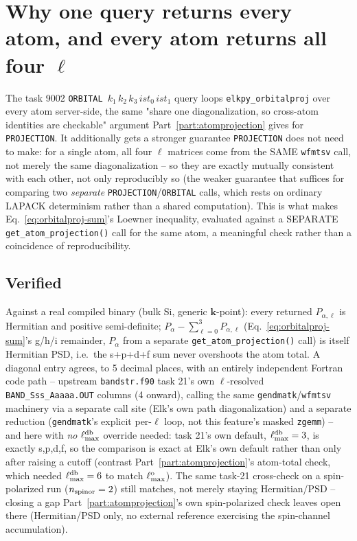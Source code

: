 \documentclass[11pt]{article}
\begin{document}
\section{Why one query returns every atom, and every atom returns all four $\ell$}
\label{sec:orbitalproj-verify}

The task 9002 \texttt{ORBITAL $k_1\,k_2\,k_3\,ist_0\,ist_1$} query loops
\texttt{elkpy\_orbitalproj} over every atom server-side, the same "share one
diagonalization, so cross-atom identities are checkable" argument
Part~\ref{part:atomprojection} gives for \texttt{PROJECTION}. It additionally gets a
stronger guarantee \texttt{PROJECTION} does not need to make: for a single atom, all four
$\ell$ matrices come from the SAME \texttt{wfmtsv} call, not merely the same
diagonalization -- so they are exactly mutually consistent with each other, not only
reproducibly so (the weaker guarantee that suffices for comparing two \emph{separate}
\texttt{PROJECTION}/\texttt{ORBITAL} calls, which rests on ordinary LAPACK determinism
rather than a shared computation). This is what makes
Eq.~\eqref{eq:orbitalproj-sum}'s Loewner inequality, evaluated against a SEPARATE
\texttt{get\_atom\_projection()} call for the same atom, a meaningful check rather than a
coincidence of reproducibility.

\subsection{Verified}

Against a real compiled binary (bulk Si, generic $\mathbf k$-point): every returned
$P_{\alpha,\ell}$ is Hermitian and positive semi-definite; $P_\alpha - \sum_{\ell=0}^3
P_{\alpha,\ell}$ (Eq.~\eqref{eq:orbitalproj-sum}'s g/h/i remainder, $P_\alpha$ from a
separate \texttt{get\_atom\_projection()} call) is itself Hermitian PSD, i.e.\ the s+p+d+f
sum never overshoots the atom total. A diagonal entry agrees, to 5 decimal places, with an
entirely independent Fortran code path -- upstream \texttt{bandstr.f90} task 21's own
$\ell$-resolved \texttt{BAND\_Sss\_Aaaaa.OUT} columns (4 onward), calling the same
\texttt{gendmatk}/\texttt{wfmtsv} machinery via a separate call site (Elk's own path
diagonalization) and a separate reduction (\texttt{gendmatk}'s explicit per-$\ell$ loop,
not this feature's masked \texttt{zgemm}) -- and here with \emph{no} $\ell_{\rm max}^{\rm
db}$ override needed: task 21's own default, $\ell_{\rm max}^{\rm db}=3$, is exactly
s,p,d,f, so the comparison is exact at Elk's own default rather than only after raising a
cutoff (contrast Part~\ref{part:atomprojection}'s atom-total check, which needed $\ell_{\rm
max}^{\rm db}=6$ to match $\ell_{\rm max}^{\rm o}$). The same task-21 cross-check on a
spin-polarized run ($n_{\rm spinor}=2$) still matches, not merely staying Hermitian/PSD --
closing a gap Part~\ref{part:atomprojection}'s own spin-polarized check leaves open there
(Hermitian/PSD only, no external reference exercising the spin-channel accumulation).
\end{document}
